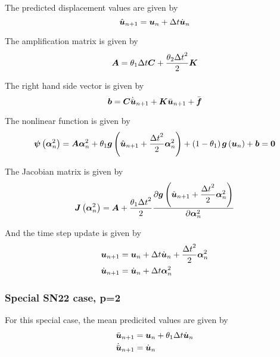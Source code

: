 The predicted displacement values are given by
\begin{equation}
   \hat{\boldsymbol{u}}_{n+1} = \boldsymbol{u}_{n}+\Delta t\dot{\boldsymbol{u}}_{n}
\end{equation}

The amplification matrix is given by
\begin{equation}
  \matr{A}=\theta_{1}\Delta t\matr{C}+\dfrac{\theta_{2}{\Delta t}^{2}}{2}\matr{K}
\end{equation}

The right hand side vector is given by
\begin{equation}
  \vectr{b}=\matr{C}\dot{\bar{\vectr{u}}}_{n+1}+\matr{K}\bar{\vectr{u}}_{n+1}+\bar{\vectr{f}}
\end{equation}

The nonlinear function is given by
\begin{equation}
  \fnof{\vectr{\psi}}{\vectr{\alpha}^{2}_{n}}=\matr{A}\vectr{\alpha}^{2}_{n}+\theta_{1}\fnof{\vectr{g}}{\hat{\vectr{u}}_{n+1}+
    \dfrac{{\Delta t}^{2}}{2}\vectr{\alpha}^{2}_{n}}+\pbrac{1-\theta_{1}}\fnof{\vectr{g}}{\vectr{u}_{n}}+\vectr{b}=\vectr{0}
\end{equation}

The Jacobian matrix is given by
\begin{equation}
  \fnof{\matr{J}}{\vectr{\alpha}^{2}_{n}}=\matr{A}+\dfrac{\theta_{1}{\Delta t}^{2}}{2}
  \delby{\fnof{\vectr{g}}{\hat{\vectr{u}}_{n+1}+\dfrac{{\Delta t}^{2}}{2}\vectr{\alpha}^{2}_{n}}}{\vectr{\alpha}^{2}_{n}}
\end{equation}

And the time step update is given by
\begin{equation}
  \begin{split}
    \boldsymbol{u}_{n+1} &= \boldsymbol{u}_{n}+\Delta t\dot{\boldsymbol{u}}_{n} +\dfrac{{\Delta t}^{2}}{2}\boldsymbol{\alpha}^{2}_{n} \\
    \dot{\boldsymbol{u}}_{n+1} &= \dot{\boldsymbol{u}}_{n}+\Delta t\boldsymbol{\alpha}^{2}_{n}
  \end{split}
\end{equation}

\subsubsection{Special SN22 case, p=2}

For this special case, the mean predicited values are given by
\begin{equation}
  \begin{split}
    \bar{\boldsymbol{u}}_{n+1} &= \boldsymbol{u}_{n}+\theta_{1}\Delta t\dot{\boldsymbol{u}}_{n}\\
    \dot{\bar{\boldsymbol{u}}}_{n+1} &= \dot{\boldsymbol{u}}_{n}
  \end{split}
\end{equation}

